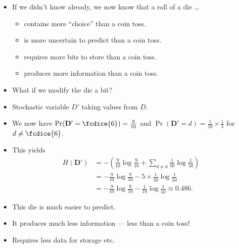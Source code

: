 \documentclass{beamer}
\let\stoch\mathbf{}
\begin{document}
\begin{frame}
  \begin{remark}
    \begin{itemize}
      \item If we didn't know already, we now know that a roll of a die \dots
        \begin{itemize}
          \item contains more \enquote{choice} than a coin toss.
          \item is more uncertain to predict than a coin toss.
          \item requires more bits to store than a coin toss.
          \item produces more information than a coin toss.
        \end{itemize}

      \item What if we modify the die a bit?
    \end{itemize}
  \end{remark}
\end{frame}

\begin{frame}
  \begin{example}
    \begin{itemize}
      \item Stochastic variable \(D'\) taking values from \(D\).
      \item We now have \(\Pr(\stoch D' = \fcdice{6}) = \frac{9}{10}\) and 
        \(\Pr(\stoch D' = d) = \frac{1}{10}\times\frac{1}{5}\) for \(d\neq 
          \fcdice{6}\).
      \item This yields
        \begin{align*}
          H(\stoch D') &= -\left( \frac{9}{10}\log\frac{9}{10} + \sum_{d\neq 6} 
            \frac{1}{50}\log\frac{1}{50} \right) \\
          &= -\frac{9}{10}\log\frac{9}{10} -5\times\frac{1}{50}\log\frac{1}{50} 
          \\
          &= -\frac{9}{10}\log\frac{9}{10} -\frac{1}{10}\log\frac{1}{50} \approx 
          0.486.
        \end{align*}
    \end{itemize}
  \end{example}
\end{frame}

\begin{frame}
  \begin{remark}
    \begin{itemize}
      \item This die is much easier to predict.
      \item It produces much less information --- less than a coin toss!
      \item Requires less data for storage etc.
    \end{itemize}
  \end{remark}
\end{frame}
\end{document}
